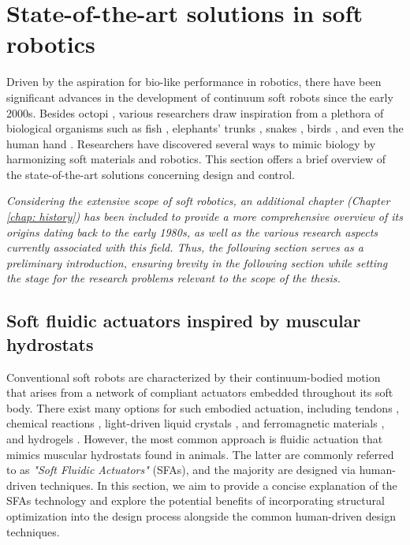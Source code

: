 \section{State-of-the-art solutions in soft robotics}
Driven by the aspiration for bio-like performance in robotics, there have been significant advances in the development of continuum soft robots since the early 2000s. Besides octopi \cite{Renda2018}, various researchers draw inspiration from a plethora of biological organisms such as fish \cite{Katzschmann2018,Marchese2015}, elephants' trunks \cite{Jones2006,Wehner2016,Godage2015}, snakes \cite{Rafsanjani2018Feb,Gazzola2018,Marchese2015}, birds \cite{Gazzola2018,Zufferey2022Dec}, and even the human hand \cite{vanLaake2022Sep,Fras2018Oct}. Researchers have discovered several ways to mimic biology by harmonizing soft materials and robotics. This section offers a brief overview of the state-of-the-art solutions concerning design and control.

\begin{rmk}
\textit{Considering the extensive scope of soft robotics, an additional chapter (Chapter \ref{chap: history}) has been included to provide a more comprehensive overview of its origins dating back to the early 1980s, as well as the various research aspects currently associated with this field. Thus, the following section serves as a preliminary introduction, ensuring brevity in the following section while setting the stage for the research problems relevant to the scope of the thesis.}
\end{rmk}

\subsection{Soft fluidic actuators inspired by muscular hydrostats}
 Conventional soft robots are characterized by their continuum-bodied motion that arises from a network of compliant actuators embedded throughout its soft body. There exist many options for such embodied actuation, including tendons \cite{Jones2006,Renda2018}, chemical reactions \cite{Bartlett2015,Hubbard2021}, light-driven liquid crystals \cite{Vantomme2021,Pilz2020,daCunha2020}, and ferromagnetic materials \cite{Kim2019AugMagnet,Venkiteswaran2019Feb}, and hydrogels \cite{Jiao2022Jun,Lee2020Dec}. However, the most common approach is fluidic actuation \cite{Katzschmann2018,Marchese2015,Overvelde2015Sep,vanLaake2022Sep} that mimics muscular hydrostats found in animals. The latter are commonly referred to as \emph{"Soft Fluidic Actuators"} (SFAs), and the majority are designed via human-driven techniques. In this section, we aim to provide a concise explanation of the SFAs technology and explore the potential benefits of incorporating structural optimization into the design process alongside the common human-driven design techniques.

